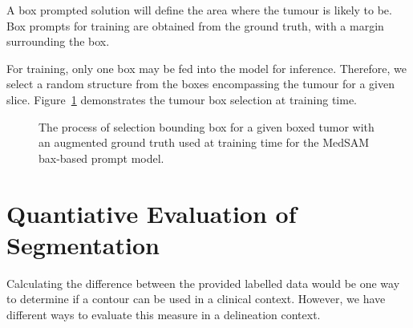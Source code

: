 \documentclass[12pt,twoside]{report}
\begin{document}
A box prompted solution will define the area where the tumour is likely to be. Box prompts for training are obtained from the ground truth, with a margin surrounding the box. 

For training, only one box may be fed into the model for inference. Therefore, we select a random structure from the boxes encompassing the tumour for a given slice. Figure~\ref{fig:box-prompt-sam-selection} demonstrates the tumour box selection at training time. 

\begin{figure}[H]
  \centering
  \caption{The process of selection bounding box for a given boxed tumor with an augmented ground truth used at training time for the MedSAM bax-based prompt model.}\label{fig:box-prompt-sam-selection}
\end{figure}

\section{Quantiative Evaluation of Segmentation}\label{sect:performance-evaluation}

Calculating the difference between the provided labelled data would be one way to determine if a contour can be used in a clinical context. However, we have different ways to evaluate this measure in a delineation context.
\end{document}
